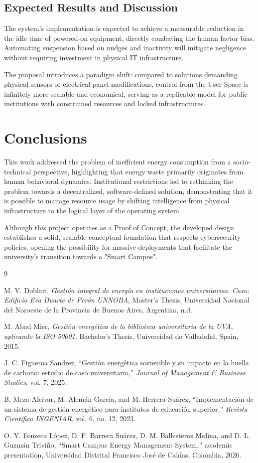 \documentclass[12pt,a4paper]{article}
\begin{document}
\subsection{Expected Results and Discussion}
The system's implementation is expected to achieve a measurable reduction in the idle time of powered-on equipment, directly combating the human factor bias. Automating suspension based on nudges and inactivity will mitigate negligence without requiring investment in physical IT infrastructure.

The proposal introduces a paradigm shift: compared to solutions demanding physical sensors or electrical panel modifications, control from the User-Space is infinitely more scalable and economical, serving as a replicable model for public institutions with constrained resources and locked infrastructures.

\section{Conclusions}
This work addressed the problem of inefficient energy consumption from a socio-technical perspective, highlighting that energy waste primarily originates from human behavioral dynamics. Institutional restrictions led to rethinking the problem towards a decentralized, software-defined solution, demonstrating that it is possible to manage resource usage by shifting intelligence from physical infrastructure to the logical layer of the operating system.

Although this project operates as a Proof of Concept, the developed design establishes a solid, scalable conceptual foundation that respects cybersecurity policies, opening the possibility for massive deployments that facilitate the university's transition towards a "Smart Campus".


\newpage
\begin{thebibliography}{9}

 M. V. Doblari, \textit{Gestión integral de energía en instituciones universitarias. Caso: Edificio Eva Duarte de Perón UNNOBA}, Master's Thesis, Universidad Nacional del Noroeste de la Provincia de Buenos Aires, Argentina, n.d.

 M. Abad Mier, \textit{Gestión energética de la biblioteca universitaria de la UVA, aplicando la ISO 50001}, Bachelor's Thesis, Universidad de Valladolid, Spain, 2015.

 J. C. Figueroa Sandrez, ``Gestión energética sostenible y su impacto en la huella de carbono: estudio de caso universitario,'' \textit{Journal of Management \& Business Studies}, vol. 7, 2025.

 B. Meza-Alcívar, M. Alemán-García, and M. Herrera-Suárez, ``Implementación de un sistema de gestión energético para institutos de educación superior,'' \textit{Revista Científica INGENIAR}, vol. 6, no. 12, 2023.

 O. Y. Fonseca López, D. F. Barrera Suárez, D. M. Ballesteros Molina, and D. L. Guzmán Triviño, ``Smart Campus Energy Management System,'' academic presentation, Universidad Distrital Francisco José de Caldas, Colombia, 2026.

\end{thebibliography}
\end{document}
